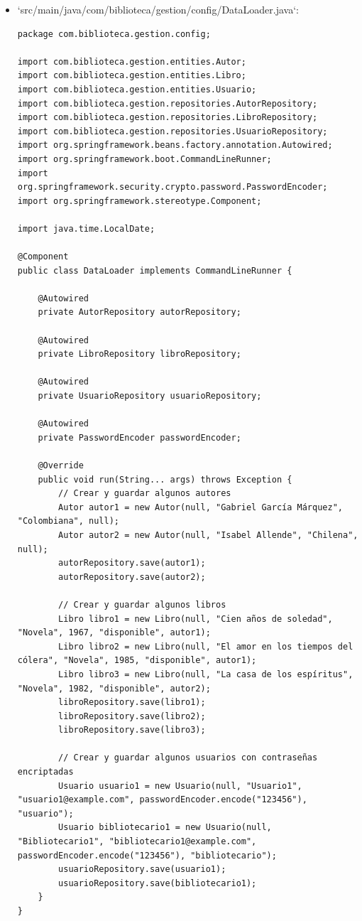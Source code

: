 \documentclass[11pt]{article}
\begin{document}
\begin{itemize}
\item `src/main/java/com/biblioteca/gestion/config/DataLoader.java`:
\label{sec:orgfd98dc8}

\begin{verbatim}
package com.biblioteca.gestion.config;

import com.biblioteca.gestion.entities.Autor;
import com.biblioteca.gestion.entities.Libro;
import com.biblioteca.gestion.entities.Usuario;
import com.biblioteca.gestion.repositories.AutorRepository;
import com.biblioteca.gestion.repositories.LibroRepository;
import com.biblioteca.gestion.repositories.UsuarioRepository;
import org.springframework.beans.factory.annotation.Autowired;
import org.springframework.boot.CommandLineRunner;
import org.springframework.security.crypto.password.PasswordEncoder;
import org.springframework.stereotype.Component;

import java.time.LocalDate;

@Component
public class DataLoader implements CommandLineRunner {

    @Autowired
    private AutorRepository autorRepository;

    @Autowired
    private LibroRepository libroRepository;

    @Autowired
    private UsuarioRepository usuarioRepository;

    @Autowired
    private PasswordEncoder passwordEncoder;

    @Override
    public void run(String... args) throws Exception {
        // Crear y guardar algunos autores
        Autor autor1 = new Autor(null, "Gabriel García Márquez", "Colombiana", null);
        Autor autor2 = new Autor(null, "Isabel Allende", "Chilena", null);
        autorRepository.save(autor1);
        autorRepository.save(autor2);

        // Crear y guardar algunos libros
        Libro libro1 = new Libro(null, "Cien años de soledad", "Novela", 1967, "disponible", autor1);
        Libro libro2 = new Libro(null, "El amor en los tiempos del cólera", "Novela", 1985, "disponible", autor1);
        Libro libro3 = new Libro(null, "La casa de los espíritus", "Novela", 1982, "disponible", autor2);
        libroRepository.save(libro1);
        libroRepository.save(libro2);
        libroRepository.save(libro3);

        // Crear y guardar algunos usuarios con contraseñas encriptadas
        Usuario usuario1 = new Usuario(null, "Usuario1", "usuario1@example.com", passwordEncoder.encode("123456"), "usuario");
        Usuario bibliotecario1 = new Usuario(null, "Bibliotecario1", "bibliotecario1@example.com", passwordEncoder.encode("123456"), "bibliotecario");
        usuarioRepository.save(usuario1);
        usuarioRepository.save(bibliotecario1);
    }
}
\end{verbatim}


\end{itemize}
\end{document}
